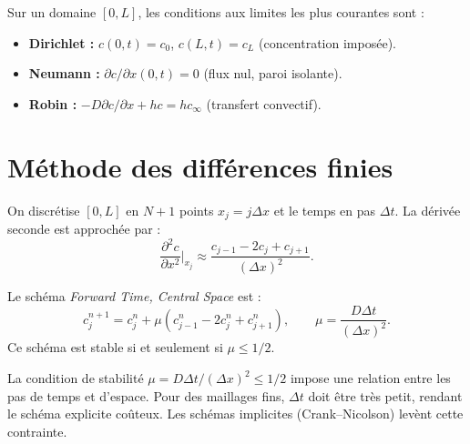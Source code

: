 \begin{definition}
Sur un domaine $[0,L]$, les conditions aux limites les plus courantes
sont :
\begin{itemize}
  \item \textbf{Dirichlet :} $c(0,t)=c_0$, $c(L,t)=c_L$ (concentration
    impos\'ee).
  \item \textbf{Neumann :} $\partial c/\partial x(0,t)=0$ (flux nul,
    paroi isolante).
  \item \textbf{Robin :} $-D\partial c/\partial x + hc = h c_\infty$
    (transfert convectif).
\end{itemize}
\end{definition}

\section{M\'ethode des diff\'erences finies}
\label{sec:differences_finies}

\begin{definition}
On discr\'etise $[0,L]$ en $N+1$ points $x_j=j\Delta x$ et le temps
en pas $\Delta t$.  La d\'eriv\'ee seconde est approch\'ee par :
\[
  \frac{\partial^2 c}{\partial x^2}\bigg|_{x_j}
  \approx \frac{c_{j-1}-2c_j+c_{j+1}}{(\Delta x)^2}.
\]
\end{definition}

\begin{theoreme}
Le sch\'ema \textit{Forward Time, Central Space} est :
\[
  c_j^{n+1} = c_j^n + \mu(c_{j-1}^n - 2c_j^n + c_{j+1}^n),
  \qquad \mu = \frac{D\Delta t}{(\Delta x)^2}.
\]
Ce sch\'ema est stable si et seulement si $\mu\leq 1/2$.
\end{theoreme}

\begin{attention}[title=\textbf{Condition CFL}]
La condition de stabilit\'e $\mu = D\Delta t/(\Delta x)^2 \leq 1/2$
impose une relation entre les pas de temps et d'espace.  Pour des
maillages fins, $\Delta t$ doit \^etre tr\`es petit, rendant le
sch\'ema explicite co\^uteux.  Les sch\'emas implicites (Crank--Nicolson)
lev\`ent cette contrainte.
\end{attention}

